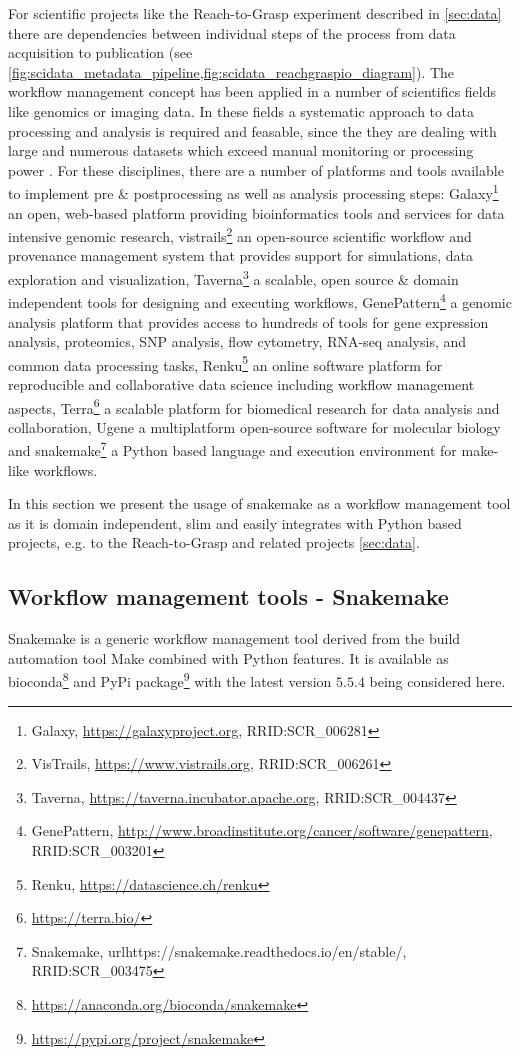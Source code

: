 For scientific projects like the Reach-to-Grasp experiment described in \cref{sec:data} there are dependencies between individual steps of the process from data acquisition to publication (see \cref{fig:scidata_metadata_pipeline,fig:scidata_reachgraspio_diagram}). The workflow management concept has been applied in a number of scientifics fields like genomics or imaging data. In these fields a systematic approach to data processing and analysis is required and feasable, since the they are dealing with large and numerous datasets which exceed manual monitoring or processing power \citep[e.g.][]{Palm_2010}.
For these disciplines, there are a number of platforms and tools available to implement pre \& postprocessing as well as analysis processing steps: Galaxy\footnote{Galaxy, \url{https://galaxyproject.org}, RRID:SCR\_006281} an  open, web-based platform providing bioinformatics tools and services for data intensive genomic research, vistrails\footnote{VisTrails, \url{https://www.vistrails.org}, RRID:SCR\_006261} an open-source scientific workflow and provenance management system that provides support for simulations, data exploration and visualization, Taverna\footnote{Taverna, \url{https://taverna.incubator.apache.org}, RRID:SCR\_004437} a scalable, open source \& domain independent tools for designing and executing workflows,  GenePattern\footnote{GenePattern, \url{http://www.broadinstitute.org/cancer/software/genepattern}, RRID:SCR\_003201} a genomic analysis platform that provides access to hundreds of tools for gene expression analysis, proteomics, SNP analysis, flow cytometry, RNA-seq analysis, and common data processing tasks, Renku\footnote{Renku, \url{https://datascience.ch/renku}} an online software platform for reproducible and collaborative data science including workflow management aspects, Terra\footnote{\url{https://terra.bio/}} a scalable platform  for biomedical research for data analysis and collaboration, Ugene \cite{Okonechnikov_2012} a multiplatform open-source software for molecular biology and snakemake\footnote{Snakemake, url{https://snakemake.readthedocs.io/en/stable/}, RRID:SCR\_003475} a Python based language and execution environment for make-like workflows.

In this section we present the usage of snakemake as a workflow management tool as it is domain independent, slim and easily integrates with Python based projects, e.g. to the Reach-to-Grasp and related projects \cref{sec:data}.

\subsection{Workflow management tools - Snakemake}
\label{sec:snakemake}
Snakemake is a generic workflow management tool derived from the build automation tool Make combined with Python features. It is available as bioconda\footnote{\url{https://anaconda.org/bioconda/snakemake}} and PyPi package\footnote{\url{https://pypi.org/project/snakemake}} with the latest version $5.5.4$ being considered here.

